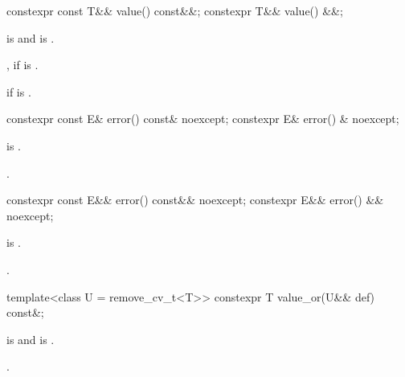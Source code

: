 %
\begin{itemdecl}
constexpr const T&& value() const&&;
constexpr T&& value() &&;
\end{itemdecl}

\begin{itemdescr}
\pnum
\mandates
{} is  and  is .

\pnum
\returns
{}, if  is .

\pnum
\throws
{} if  is .
\end{itemdescr}

%
\begin{itemdecl}
constexpr const E& error() const& noexcept;
constexpr E& error() & noexcept;
\end{itemdecl}

\begin{itemdescr}
\pnum
\hardexpects
{} is .

\pnum
\returns
{}.
\end{itemdescr}

%
\begin{itemdecl}
constexpr const E&& error() const&& noexcept;
constexpr E&& error() && noexcept;
\end{itemdecl}

\begin{itemdescr}
\pnum
\hardexpects
{} is .

\pnum
\returns
{}.
\end{itemdescr}

%
\begin{itemdecl}
template<class U = remove_cv_t<T>> constexpr T value_or(U&& def) const&;
\end{itemdecl}

\begin{itemdescr}
\pnum
\mandates
{} is  and  is .

\pnum
\returns
{}.
\end{itemdescr}

